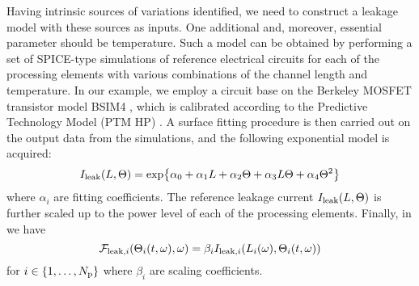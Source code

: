 Having intrinsic sources of variations identified, we need to construct a leakage model with these sources as inputs. One additional and, moreover, essential parameter should be temperature. Such a model can be obtained by performing a set of SPICE-type simulations of reference electrical circuits for each of the processing elements with various combinations of the channel length and temperature. In our example, we employ a circuit base on the Berkeley MOSFET transistor model BSIM4 \cite{bsim4}, which is calibrated according to the Predictive Technology Model (PTM HP) \cite{ptm}. A surface fitting procedure is then carried out on the output data from the simulations, and the following exponential model is acquired:
\begin{equation} \elabel{leakage-current}
  I_\leak(\Leff, \T) = \text{exp} \big\{ \alpha_0 + \alpha_1 \Leff + \alpha_2 \T + \alpha_3 \Leff \T + \alpha_4 \T^2 \big\}
\end{equation}
where $\alpha_i$ are fitting coefficients. The reference leakage current $I_{\text{leak}}(L, \Theta)$ is further scaled up to the power level of each of the processing elements. Finally, in  we have
\[
  \mathcal{F}_{\text{leak}, i}(\Theta_i(t, \omega), \omega) = \beta_i I_{\text{leak}, i}(L_i(\omega), \Theta_i(t, \omega))
\]
for $i \in \{ 1, \dotsc, {N_\text{p}} \}$ where $\beta_i$ are scaling coefficients.
